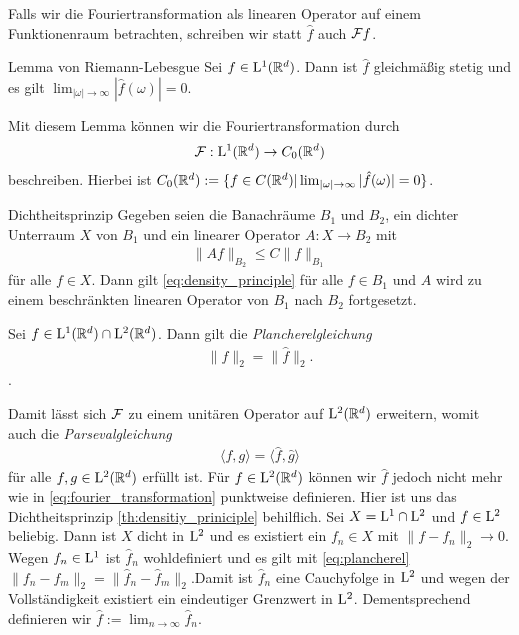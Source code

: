 Falls wir die Fouriertransformation als linearen Operator auf einem Funktionenraum betrachten, schreiben wir statt $ \hat{f} $ auch $ \mathcal{F} f $.
\begin{genericthm}{Lemma von Riemann-Lebesgue}
	Sei $ f \in \mathrm{L}^1(\mathbb{R}^d) $.
	Dann ist $ \hat{f} $ gleichmäßig stetig und es gilt
	$ \lim_{|\omega| \to \infty} | \hat{f}(\omega) | = 0 $.
\end{genericthm}
Mit diesem Lemma können wir die Fouriertransformation durch
\begin{align*}
\mathcal{F} : \mathrm{L}^1(\mathbb{R}^d) \to C_0(\mathbb{R}^d)
\end{align*}
beschreiben. Hierbei ist $ C_0(\mathbb{R}^d) :=  \{ f \in C(\mathbb{R}^d) |   \lim_{|\omega| \to \infty} | \hat{f}(\omega) | = 0\} $. 

\begin{genericthm}{Dichtheitsprinzip}\label{th:densitiy_priniciple}
	Gegeben seien die Banachräume  $ B_1 $ und $ B_2 $, ein dichter Unterraum $ X $ von $ B_1 $ und ein linearer Operator $ A : X \to B_2 $ mit
	\begin{align}\label{eq:density_principle}
	\| A f \|_{B_2} \leq C \| f \|_{B_1}
	\end{align}
	für  alle $  f \in X $.
	Dann gilt \eqref{eq:density_principle} für alle $ f \in B_1 $ und $ A $ wird zu einem beschränkten linearen Operator von $ B_1  $ nach $ B_2 $ fortgesetzt.
\end{genericthm}
\begin{sz}
	Sei $ f \in \mathrm{L}^1(\mathbb{R}^d) \cap \mathrm{L}^2(\mathbb{R}^d) $. Dann gilt die \textit{Plancherelgleichung}
	\begin{align}\label{eq:plancherel}
	\|f \|_2 = \| \hat{f} \|_2.
	\end{align}
	.
\end{sz}
Damit lässt sich $ \mathcal{F} $ zu einem unitären Operator auf $ \mathrm{L}^2(\mathbb{R}^d) $ erweitern, womit auch die \textit{Parsevalgleichung}
\begin{align}\label{eq:parseval}
\langle f, g \rangle = \langle \hat{f} , \hat{g} \rangle
\end{align}
für alle $ f,g \in \mathrm{L}^2(\mathbb{R}^d) $ erfüllt ist.
Für $ f \in \mathrm{L}^2(\mathbb{R}^d)  $ können wir $ \hat{f} $ jedoch nicht mehr wie in \eqref{eq:fourier_transformation} punktweise definieren. 
Hier ist uns das Dichtheitsprinzip \ref{th:densitiy_priniciple} behilflich.
Sei $ X = \mathrm{L}^1 \cap \mathrm{L}^2 $ und $ f \in \mathrm{L}^2  $ beliebig. Dann ist $ X $ dicht in $ \mathrm{L}^2 $ und es existiert ein $f_n  \in X$ mit $ \| f - f_n \|_2 \to 0 $.
Wegen $ f_n \in \mathrm{L}^1 $ ist $ \hat{f}_n $ wohldefiniert und es gilt mit \eqref{eq:plancherel} $ \| f_n - f_m \|_2 = \| \hat{f}_n - \hat{f}_m \|_2 $.Damit ist $ \hat{f}_n $ eine Cauchyfolge in $ \mathrm{L}^2 $ und wegen der Vollständigkeit existiert ein eindeutiger Grenzwert in $ \mathrm{L}^2 $.
Dementsprechend definieren wir $ \hat{f} := \lim_{n \to \infty} \hat{f}_n $.

